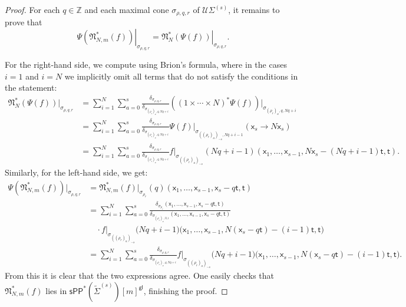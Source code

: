 \documentclass[11pt]{article}
\def\ZZ{\mathbb{Z}}
\newcommand{\sPP}{\mathsf{sPP}}
\newcommand{\spp}{\sPP}
\theoremstyle{definition}
\begin{document}
\begin{proof}
	For each $q \in \ZZ$ and each maximal cone $\sigma_{\rho,q,r}$ of $\mathcal U\Sigma^{(s)}$, it remains to prove that
    \[
    \left.\Psi(\mathfrak N_{N,m}^*(f))\right|_{\sigma_{\rho,q,r}}
    =
    \left.\mathfrak N_N^*(\Psi(f))\right|_{\sigma_{\rho,q,r}}.
    \]

	For the right-hand side, we compute using Brion's formula, where in the cases $i=1$ and $i=N$ we implicitly omit all terms that do not satisfy the conditions in the statement:
	\begin{align*}
		\mathfrak{N}_N^\ast(\Psi(f))|_{\sigma_{\rho,q,r}}&=\sum_{i=1}^{N}\sum_{a=0}^{s}\frac{\delta_{\sigma_{\rho,q,r}}}{\delta_{\sigma_{(\rho_r)_a,q,Nq+i}}}((1\times\cdots\times N)^{\ast}\Psi(f))|_{\sigma_{(\rho_r)_a,q,Nq+i}}\\
													&=\sum_{i=1}^{N}\sum_{a=0}^{s}\frac{\delta_{\sigma_{\rho,q,r}}}{\delta_{\sigma_{(\rho_r)_a,q,Nq+i}}}\Psi(f)|_{\sigma_{((\rho_r)_a)_{-s},Nq+i-1}}(\mathsf{x}_s\to N\mathsf{x}_s)\\
													&=\sum_{i=1}^{N}\sum_{a=0}^{s}\frac{\delta_{\sigma_{\rho,q,r}}}{\delta_{\sigma_{(\rho_r)_a,q,Nq+i}}}f|_{\sigma_{((\rho_r)_a)_{-s}}}(Nq+i-1)(\mathsf{x}_1,\dots,\mathsf{x}_{s-1},N\mathsf{x}_s-(Nq+i-1)\mathsf{t},\mathsf{t}).
	\end{align*}
	Similarly, for the left-hand side, we get:
	\begin{align*}
		\Psi(\mathfrak{N}_{N,m}^\ast(f))|_{\sigma_{\rho,q,r}}&=\mathfrak{N}_{N,m}^\ast(f)|_{\sigma_{\rho_r}}(q)(\mathsf{x}_1,\dots,\mathsf{x}_{s-1},\mathsf{x}_s-q\mathsf{t},\mathsf{t})\\
														   &=\sum_{i=1}^{N}\sum_{a=0}^{s} \frac{\delta_{\sigma_{\rho_r}}(\mathsf{x}_1,\dots,\mathsf{x}_{s-1},\mathsf{x}_s-q\mathsf{t},\mathsf{t})}{\delta_{\sigma_{(\rho_r)_a,0,i}}(\mathsf{x}_1,\dots,\mathsf{x}_{s-1},\mathsf{x}_s-q\mathsf{t},\mathsf{t})}\, \\
														   &\quad \cdot f|_{\sigma_{((\rho_r)_a)_{-s}}} \bigl(Nq+i-1\bigr) \bigl(\mathsf{x}_1,\dots,\mathsf{x}_{s-1},N(\mathsf{x}_s-q\mathsf{t})-(i-1)\mathsf{t},\mathsf{t}\bigr)\\
														   &=\sum_{i=1}^{N}\sum_{a=0}^{s} \frac{\delta_{\sigma_{\rho,q,r}}}{\delta_{\sigma_{(\rho_r)_a,q,Nq+i}}}f|_{\sigma_{((\rho_r)_a)_{-s}}} \bigl(Nq+i-1\bigr) \bigl(\mathsf{x}_1,\dots,\mathsf{x}_{s-1},N(\mathsf{x}_s-q\mathsf{t})-(i-1)\mathsf{t},\mathsf{t}\bigr).
	\end{align*}
	From this it is clear that the two expressions agree.
	One easily checks that $\mathfrak{N}_{N,m}^\ast(f)$ lies in $\spp^{\ast}(\tilde{\Sigma}^{(s)})[m]^{\mathsf{gl}}$,
	finishing the proof.
\end{proof}
\end{document}
